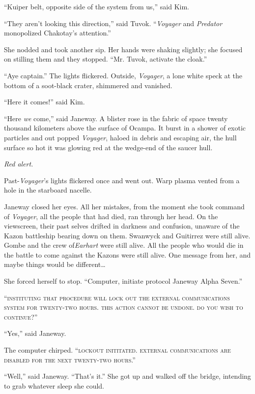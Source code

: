 \documentclass[twoside,letterpaper,12pt]{memoir}
\begin{document}
``Kuiper belt, opposite side of the system from us,'' said Kim. 

``They aren't looking this direction,'' said Tuvok. ``\textit{Voyager }and \textit{Predator} monopolized Chakotay's attention.'' 

She nodded and took another sip. Her hands were shaking slightly; she focused on stilling them and they stopped. ``Mr. Tuvok, activate the cloak.'' 

``Aye captain.'' The lights flickered. Outside, \textit{Voyager}, a lone white speck at the bottom of a soot-black crater, shimmered and vanished. 

``Here it comes!'' said Kim. 

``Here \textit{we} come,'' said Janeway. A blister rose in the fabric of space twenty thousand kilometers above the surface of Ocampa. It burst in a shower of exotic particles and out popped \textit{Voyager}, haloed in debris and escaping air, the hull surface so hot it was glowing red at the wedge-end of the saucer hull. 

\textit{Red alert.} 

Past-\textit{Voyager}'s lights flickered once and went out. Warp plasma vented from a hole in the starboard nacelle. 

Janeway closed her eyes. All her mistakes, from the moment she took command of \textit{Voyager}, all the people that had died, ran through her head. On the viewscreen, their past selves drifted in darkness and confusion, unaware of the Kazon battleship bearing down on them. Swanwyck and Guitirrez were still alive. Gombe and the crew of\textit{Earhart }were still alive. All the people who would die in the battle to come against the Kazons were still alive. One message from her, and maybe things would be different\ldots 

She forced herself to stop. ``Computer, initiate protocol Janeway Alpha Seven.'' 

``\textsc{instituting that procedure will lock out the external communications system for twenty-two hours. this action cannot be undone. do you wish to continue?}'' 

``Yes,'' said Janeway. 

The computer chirped. ``\textsc{lockout inititated. external communications are disabled for the next twenty-two hours}.'' 

``Well,'' said Janeway. ``That's it.'' She got up and walked off the bridge, intending to grab whatever sleep she could. 
\end{document}
